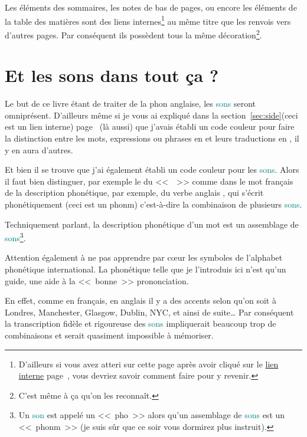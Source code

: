 Les éléments des sommaires, les notes de bas de pages, ou encore les
éléments de la table des matières sont des \hypertarget{linkin}{liens
  internes}\footnote{D'ailleurs si vous avez atteri sur cette page
  après avoir cliqué sur le \hyperlink{retour}{lien interne}
  page~\pageref{retour}, vous devriez savoir comment faire pour y
  revenir.} au même titre que les renvois vers d'autres pages. Par
conséquent ils possèdent tous la même décoration\footnote{C'est même à
ça qu'on les reconnaît.}.  

\newpage

\section{Et les sons dans tout ça ?}\label{sec:phonetics}

Le but de ce livre étant de traiter de la \gls{phon} anglaise, les
\textcolor{teal}{sons} seront omniprésent. D'ailleurs même si je vous ai expliqué dans
la section~\ref{sec:side}(ceci est un lien interne)
page~\pageref{sec:side} (là aussi) que j'avais établi un code
couleur pour faire la distinction entre les mots, expressions ou
phrases en  et leurs traductions en , il
y en aura d'autres.

Et bien il se trouve que j'ai également établi un code couleur pour
les \textcolor{teal}{sons}. Alors il faut bien distinguer, par exemple
le \son {} du <<~~>> comme dans le mot français  de la
description phonétique, par exemple, du verbe anglais , qui
s'écrit phonétiquement  (ceci est un \gls{phonm}) c'est-à-dire
la combinaison de plusieurs \textcolor{teal}{sons}.

Techniquement parlant, la description phonétique d'un mot est un
assemblage de \textcolor{teal}{sons}\footnote{Un \textcolor{teal}{son}
  est appelé un <<~\gls{pho}~>> alors qu'un assemblage de
  \textcolor{teal}{sons} est un <<~\gls{phonm}~>> (je suis sûr que ce soir
  vous dormirez plus instruit).}.

Attention également à ne pas apprendre par c{\oe}ur les symboles de
l'alphabet phonétique international. La phonétique telle que je
l'introduis ici n'est qu'un guide, une aide à la <<~bonne~>>
prononciation.

En effet, comme en français, en anglais il y a des accents selon qu'on
soit à Londres, Manchester, Glasgow, Dublin, NYC, et ainsi de suite\dots\xspace Par conséquent
la transcription fidèle et rigoureuse des \textcolor{teal}{sons}
impliquerait beaucoup trop de combinaisons et serait quasiment
impossible à mémoriser.

